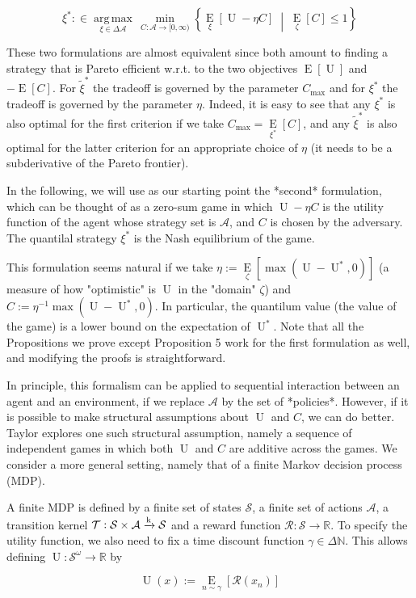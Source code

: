 \documentclass[a4paper]{article}
\newcommand{\AP}[1]{\left(#1\right)}
\newcommand{\AB}[1]{\left[#1\right]}
\newcommand{\ACM}[2]{\left\{#1\;\middle\vert\;#2\right\}}
\newcommand{\Ea}[2]{\underset{#1}{\operatorname{E}}\AB{#2}}
\newcommand{\Argmax}[1]{\underset{#1}{\operatorname{arg\,max}}\,}
\newcommand{\Nats}{\mathbb{N}}
\newcommand{\Reals}{\mathbb{R}}
\newcommand{\K}{\xrightarrow{\textnormal{k}}}
\newcommand{\A}{\mathcal{A}}
\newcommand{\St}{\mathcal{S}}
\newcommand{\T}{\mathcal{T}}
\newcommand{\R}{\mathcal{R}}
\newcommand{\Ut}{\operatorname{U}}
\newcommand{\Co}{C}
\begin{document}
$$\xi^* :\in \Argmax{\xi \in \Delta\A}\min_{\Co:\A\rightarrow[0,\infty)}\ACM{\Ea{\xi}{\Ut-\eta \Co}}{\Ea{\zeta}{\Co} \leq 1}$$

These two formulations are almost equivalent since both amount to finding a strategy that is Pareto efficient w.r.t. to the two objectives $\Ea{}{\Ut}$ and $-\Ea{}{\Co}$. For $\tilde{\xi}^*$ the tradeoff is governed by the parameter $C_{\max}$ and for $\xi^*$ the tradeoff is governed by the parameter $\eta$. Indeed, it is easy to see that any $\xi^*$ is also optimal for the first criterion if we take $C_{\max}=\Ea{\xi^*}{\Co}$, and any $\tilde{\xi}^*$ is also optimal for the latter criterion for an appropriate choice of $\eta$ (it needs to be a subderivative of the Pareto frontier).

In the following, we will use as our starting point the *second* formulation, which can be thought of as a zero-sum game in which $\Ut-\eta \Co$ is the utility function of the agent whose strategy set is $\A$, and $\Co$ is chosen by the adversary. The quantilal strategy $\xi^*$ is the Nash equilibrium of the game.

This formulation seems natural if we take $\eta:=\Ea{\zeta}{\max\AP{\Ut-\Ut^*,0}}$ (a measure of how "optimistic" is $\Ut$ in the "domain" $\zeta$) and $\Co:=\eta^{-1}\max\AP{\Ut-\Ut^*,0}$. In particular, the quantilum value (the value of the game) is a lower bound on the expectation of $\Ut^*$. Note that all the Propositions we prove except Proposition 5 work for the first formulation as well, and modifying the proofs is straightforward.

In principle, this formalism can be applied to sequential interaction between an agent and an environment, if we replace $\A$ by the set of *policies*. However, if it is possible to make structural assumptions about $\Ut$ and $C$, we can do better. Taylor explores one such structural assumption, namely a sequence of independent games in which both $\Ut$ and $\Co$ are additive across the games. We consider a more general setting, namely that of a finite Markov decision process (MDP).

A finite MDP is defined by a finite set of states $\St$, a finite set of actions $\A$, a transition kernel $\T: \St \times \A \K \St$ and a reward function $\R: \St \rightarrow \Reals$. To specify the utility function, we also need to fix a time discount function $\gamma \in \Delta\Nats$. This allows defining $\Ut: \St^\omega \rightarrow \Reals$ by

$$\Ut(x):=\Ea{n\sim\gamma}{\R\AP{x_n}}$$
\end{document}
